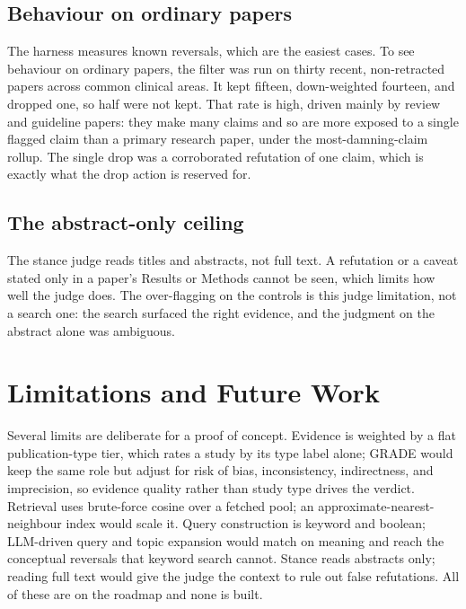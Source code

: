 \documentclass[11pt,a4paper]{article}
\begin{document}
\subsection{Behaviour on ordinary papers}

The harness measures known reversals, which are the easiest cases. To see behaviour on ordinary papers, the filter was run on thirty recent, non-retracted papers across common clinical areas. It kept fifteen, down-weighted fourteen, and dropped one, so half were not kept. That rate is high, driven mainly by review and guideline papers: they make many claims and so are more exposed to a single flagged claim than a primary research paper, under the most-damning-claim rollup. The single drop was a corroborated refutation of one claim, which is exactly what the drop action is reserved for.

\subsection{The abstract-only ceiling}

The stance judge reads titles and abstracts, not full text. A refutation or a caveat stated only in a paper's Results or Methods cannot be seen, which limits how well the judge does. The over-flagging on the controls is this judge limitation, not a search one: the search surfaced the right evidence, and the judgment on the abstract alone was ambiguous.

\section{Limitations and Future Work}

Several limits are deliberate for a proof of concept. Evidence is weighted by a flat publication-type tier, which rates a study by its type label alone; GRADE \citep{grade2008} would keep the same role but adjust for risk of bias, inconsistency, indirectness, and imprecision, so evidence quality rather than study type drives the verdict. Retrieval uses brute-force cosine over a fetched pool; an approximate-nearest-neighbour index would scale it. Query construction is keyword and boolean; LLM-driven query and topic expansion would match on meaning and reach the conceptual reversals that keyword search cannot. Stance reads abstracts only; reading full text would give the judge the context to rule out false refutations. All of these are on the roadmap and none is built.
\end{document}
